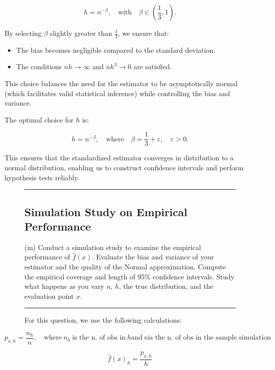 \documentclass{article}
\newenvironment{colorparagraph}[1]{\par\color{#1}}{\par}
\begin{document}
\[
h = n^{-\beta}, \quad \text{with} \quad \beta \in \left( \frac{1}{3}, 1 \right).
\]

By selecting \( \beta \) slightly greater than \( \frac{1}{3} \), we ensure that:

\begin{itemize}
    \item The bias becomes negligible compared to the standard deviation.
    \item The conditions \( n h \to \infty \) and \( n h^3 \to 0 \) are satisfied.
\end{itemize}

This choice balances the need for the estimator to be asymptotically normal (which facilitates valid statistical inference) while controlling the bias and variance.

The optimal choice for \( h \) is:

\[
h = n^{-\beta}, \quad \text{where} \quad \beta = \frac{1}{3} + \varepsilon, \quad \varepsilon > 0.
\]

This ensures that the standardized estimator converges in distribution to a normal distribution, enabling us to construct confidence intervals and perform hypothesis tests reliably.

\begin{figure}[H]
\begin{colorparagraph}{questioncolor}
\label{q2m}
\rule{\textwidth}{0.5pt}
\subsection{Simulation Study on Empirical Performance}
(m) Conduct a simulation study to examine the empirical performance of \( \hat{f}(x) \). Evaluate the bias and variance of your estimator and the quality of the Normal approximation. Compute the empirical coverage and length of 95\% confidence intervals. Study what happens as you vary \( n \), \( h \), the true distribution, and the evaluation point \( x \).

\rule{\textwidth}{0.5pt}
\end{colorparagraph}

For this question, we use the following calculations:
\end{figure}

$$
p_{x, h} = \frac{n_h}{n}, \quad \text{where} \ n_h \ \text{is the n. of obs in} \ h \text{and} \ n \text{is the n. of obs in the sample simulation}
$$

$$
\hat{f}(x)_h = \frac{p_{x, h}}{h} 
$$
\end{document}
